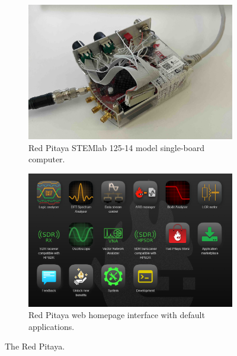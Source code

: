 \begin{figure}[ht]
    \centering
    \begin{subfigure}[t]{0.47\linewidth}
        \centering
        \includegraphics[width=\textwidth]{images/chapter_2/red_pitaya.jpeg}
        \caption{Red Pitaya STEMlab 125-14 model single-board computer.}
        \label{fig:ch2_red_pitaya}
    \end{subfigure}
    \hspace{.025\linewidth}
    \begin{subfigure}[t]{0.47\linewidth}
        \centering
        \includegraphics[width=\textwidth]{images/chapter_2/rp_apps.png}
        \caption{Red Pitaya web homepage interface with default applications.}
        \label{fig:ch2_rp_apps}
    \end{subfigure}
    \caption{The Red Pitaya.}
    \label{fig:ch1_lenses_cavity}
\end{figure}

